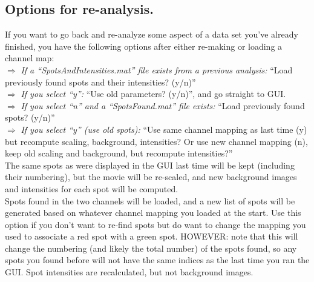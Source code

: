 \documentclass[11pt]{article}
\begin{document}
\subsection{Options for re-analysis.}\label{sec:AnalysisOptions}

\noindent If you want to go back and re-analyze some aspect of a data set you've already finished, you have the following options after either re-making or loading a channel map:\\

\noindent $\Rightarrow$ {\it If a ``SpotsAndIntensities.mat'' file exists from a previous analysis:} ``Load previously found spots and their intensities? (y/n)''  \\

$\Rightarrow$ {\it If you select ``y'':} ``Use old parameters? (y/n)'', and go straight to GUI.\\

$\Rightarrow$ {\it If you select ``n'' and a ``SpotsFound.mat'' file exists:} ``Load previously found spots? (y/n)''  \\

\indent\indent $\Rightarrow$ {\it If you select ``y'' (use old spots):} ``Use same channel mapping as last time (y) but recompute scaling, background, intensities?  Or use new channel mapping (n), keep old scaling and background, but recompute intensities?''\\

\indent\indent{} The same spots as were displayed in the GUI last
\indent\indent\indent\indent  time will be kept (including their numbering), but the movie will be re-scaled, and new
\indent\indent\indent\indent background images and intensities for each spot will be computed.\\

\indent\indent{} Spots found in the two channels will be loaded, and a new list of spots 
\indent\indent\indent\indent will be generated based on whatever channel mapping you loaded at the start.  Use  
\indent\indent\indent\indent this option if you don't want to re-find spots but do want to change the mapping you  
\indent\indent\indent\indent used to associate a red spot with a green spot.  HOWEVER: note that this will change 
\indent\indent\indent\indent the numbering (and likely the total number) of the spots found, so any spots you found 
\indent\indent\indent\indent before will not have the same indices as the last time you ran the GUI.  Spot intensities 
\indent\indent\indent\indent are recalculated, but not background images.\\
\end{document}

